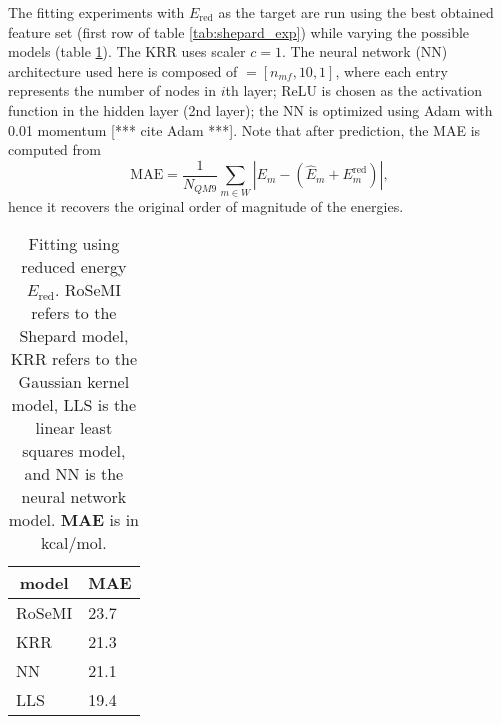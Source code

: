 \documentclass[12pt]{article}
\def\att{                    %
        \marginpar[ \hspace*{\fill} \raisebox{-0.2em}{\rule{2mm}{1.2em}} ]
        {\raisebox{-0.2em}{\rule{2mm}{1.2em}} }
        }
\def\at#1{[*** \att #1 ***]}  %
\begin{document}
The fitting experiments with $E_\text{red}$ as the target are run using the best obtained feature set (first row of table \ref{tab:shepard_exp}) while varying the possible models (table \ref{tab:red_exp}). The KRR uses scaler $c=1$. The neural network (NN) architecture used here is composed of $ = [n_{mf}, 10, 1]$, where each entry represents the number of nodes in $i$th layer; ReLU is chosen as the activation function in the hidden layer (2nd layer); the NN is optimized using Adam with 0.01 momentum \at{cite Adam}. Note that after prediction, the MAE is computed from
\begin{equation}
	\text{MAE} = \frac{1}{N_{QM9}} \sum_{m \in W} |E_m - (\hat{E}_m + E_m^\text{red})|,
\end{equation}
hence it recovers the original order of magnitude of the energies.

\begin{table}[H]
	\centering
	\caption{Fitting using reduced energy $E_\text{red}$. RoSeMI refers to the Shepard model, KRR refers to the Gaussian kernel model, LLS is the linear least squares model, and NN is the neural network model. \textbf{MAE} is in kcal/mol.}
	\begin{tabular}{|l|l|}
		\hline
		\multicolumn{1}{|c|}{\textbf{model}} & \multicolumn{1}{|c|}{\textbf{MAE}} \\ \hline
		RoSeMI & 23.7 \\ \hline
		KRR & 21.3 \\ \hline
		NN & 21.1 \\ \hline
		LLS & 19.4 \\ \hline
	\end{tabular}
	\label{tab:red_exp}
\end{table}
\end{document}

